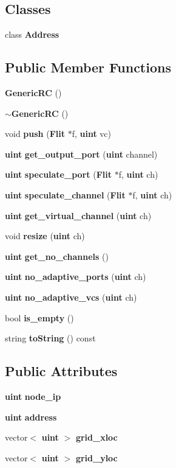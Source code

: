 \subsection*{Classes}
\begin{CompactItemize}
\item 
class {\bf Address}
\end{CompactItemize}
\subsection*{Public Member Functions}
\begin{CompactItemize}
\item 
{\bf GenericRC} ()
\item 
{\bf $\sim$GenericRC} ()
\item 
void {\bf push} ({\bf Flit} $\ast$f, {\bf uint} vc)
\item 
{\bf uint} {\bf get\_\-output\_\-port} ({\bf uint} channel)
\item 
{\bf uint} {\bf speculate\_\-port} ({\bf Flit} $\ast$f, {\bf uint} ch)
\item 
{\bf uint} {\bf speculate\_\-channel} ({\bf Flit} $\ast$f, {\bf uint} ch)
\item 
{\bf uint} {\bf get\_\-virtual\_\-channel} ({\bf uint} ch)
\item 
void {\bf resize} ({\bf uint} ch)
\item 
{\bf uint} {\bf get\_\-no\_\-channels} ()
\item 
{\bf uint} {\bf no\_\-adaptive\_\-ports} ({\bf uint} ch)
\item 
{\bf uint} {\bf no\_\-adaptive\_\-vcs} ({\bf uint} ch)
\item 
bool {\bf is\_\-empty} ()
\item 
string {\bf toString} () const 
\end{CompactItemize}
\subsection*{Public Attributes}
\begin{CompactItemize}
\item 
{\bf uint} {\bf node\_\-ip}
\item 
{\bf uint} {\bf address}
\item 
vector$<$ {\bf uint} $>$ {\bf grid\_\-xloc}
\item 
vector$<$ {\bf uint} $>$ {\bf grid\_\-yloc}
\end{CompactItemize}
